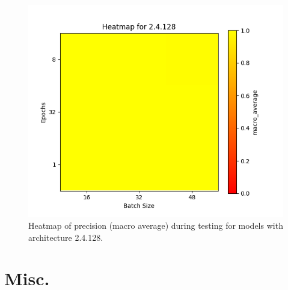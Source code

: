 \documentclass[12pt]{article}
\begin{document}
\begin{figure}[H]
\includegraphics[width=\textwidth]{heatmap_precision_macro_average_2.4.128}
\centering
\caption{Heatmap of precision (macro average) during testing for models with architecture 2.4.128.}
\label{fig:time-metrics}
\end{figure}





\section{Misc.}
\end{document}
